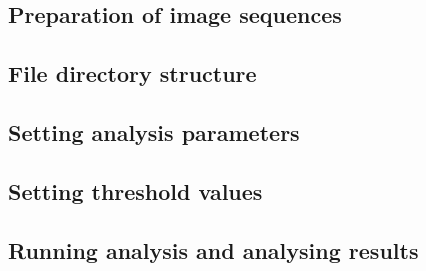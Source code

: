 \documentclass[11pt]{article} %
\begin{document}
\subsection{Preparation of image sequences}

\subsection{File directory structure}

\subsection{Setting analysis parameters}

\subsection{Setting threshold values}

\subsection{Running analysis and analysing results}
\end{document}
